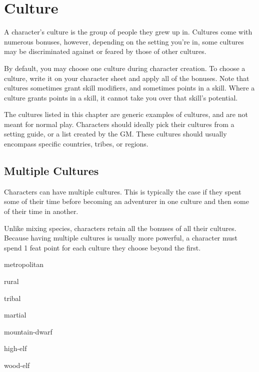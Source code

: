 \chapter{Culture}\label{culture}

\begin{multicols*}{2}
    A character's culture is the group of people they grew up in. Cultures come
    with numerous bonuses, however, depending on the setting you're in, some
    cultures may be discriminated against or feared by those of other cultures.

    By default, you may choose one culture during character creation. To choose a
    culture, write it on your character sheet and apply all of the bonuses. Note
    that cultures sometimes grant skill modifiers, and sometimes points in a skill.
    Where a culture grants points in a skill, it cannot take you over that skill's
    potential.

    The cultures listed in this chapter are generic examples of cultures, and are
    not meant for normal play. Characters should ideally pick their cultures from
    a setting guide, or a list created by the GM. These cultures should usually
    encompass specific countries, tribes, or regions.

    \section{Multiple Cultures}
    Characters can have multiple cultures. This is typically the case if they spent
    some of their time before becoming an adventurer in one culture and then some
    of their time in another.

    Unlike mixing species, characters retain all the bonuses of all their cultures.
    Because having multiple cultures is usually more powerful, a character must
    spend 1 feat point for each culture they choose beyond the first.

    {metropolitan}

    {rural}

    {tribal}

    {martial}

    {mountain-dwarf}

    {high-elf}

    {wood-elf}
\end{multicols*}

